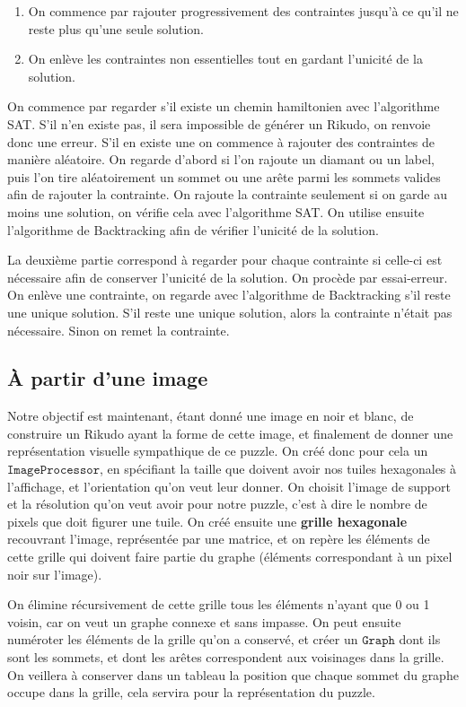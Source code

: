 \documentclass[11pt, a4paper]{article}
\begin{document}
\begin{enumerate}
    \item On commence par rajouter progressivement des contraintes jusqu'à ce qu'il ne reste plus qu'une seule solution.
    \item On enlève les contraintes non essentielles tout en gardant l'unicité de la solution. 
\end{enumerate}

On commence par regarder s'il existe un chemin hamiltonien avec l'algorithme SAT. S'il n'en existe pas, il sera impossible de générer un Rikudo, on renvoie donc une erreur. S'il en existe une on commence à rajouter des contraintes de manière aléatoire. On regarde d'abord si l'on rajoute un diamant ou un label, puis l'on tire aléatoirement un sommet ou une arête parmi les sommets valides afin de rajouter la contrainte. On rajoute la contrainte seulement si on garde au moins une solution, on vérifie cela avec l'algorithme SAT. On utilise ensuite l'algorithme de Backtracking afin de vérifier l'unicité de la solution. 

La deuxième partie correspond à regarder pour chaque contrainte si celle-ci est nécessaire afin de conserver l'unicité de la solution. On procède par essai-erreur. On enlève une contrainte, on regarde avec l'algorithme de Backtracking s'il reste une unique solution. S'il reste une unique solution, alors la contrainte n'était pas nécessaire. Sinon on remet la contrainte. 

\subsection{À partir d'une image}

Notre objectif est maintenant, étant donné une image en noir et blanc, de construire un Rikudo ayant la forme de cette image, et finalement de donner une représentation visuelle sympathique de ce puzzle. On créé donc pour cela un $\mathtt{ImageProcessor}$, en spécifiant la taille que doivent avoir nos tuiles hexagonales à l'affichage, et l'orientation qu'on veut leur donner. On choisit l'image de support et la résolution qu'on veut avoir pour notre puzzle, c'est à dire le nombre de pixels que doit figurer une tuile. On créé ensuite une \textbf{grille hexagonale} recouvrant l'image, représentée par une matrice, et on repère les éléments de cette grille qui doivent faire partie du graphe (éléments correspondant à un pixel noir sur l'image).

On élimine récursivement de cette grille tous les éléments n'ayant que 0 ou 1 voisin, car on veut un graphe connexe et sans impasse. On peut ensuite numéroter les éléments de la grille qu'on a conservé, et créer un $\mathtt{Graph}$ dont ils sont les sommets, et dont les arêtes correspondent aux voisinages dans la grille. On veillera à conserver dans un tableau la position que chaque sommet du graphe occupe dans la grille, cela servira pour la représentation du puzzle.
\end{document}
